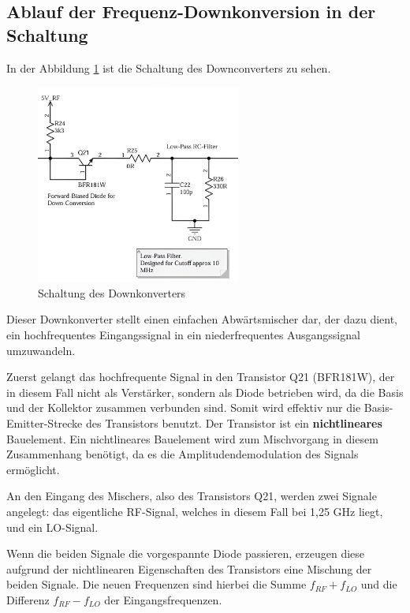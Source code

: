 \subsection{Ablauf der Frequenz-Downkonversion in der Schaltung}
In der Abbildung \ref{fig:downconverter} ist die Schaltung des Downconverters zu sehen.
\begin{figure}[H]
    \centering
    \includegraphics[width=0.6\textwidth]{Pictures/Downconverter.png}
    \caption{Schaltung des Downkonverters}
    \label{fig:downconverter}
\end{figure}
Dieser Downkonverter stellt einen einfachen Abwärtsmischer dar, der dazu dient, ein hochfrequentes Eingangssignal in ein niederfrequentes Ausgangssignal umzuwandeln. 

Zuerst gelangt das hochfrequente Signal in den Transistor Q21 (BFR181W), der in diesem Fall nicht als Verstärker, sondern als Diode betrieben wird, da die Basis und der Kollektor zusammen verbunden sind. Somit wird effektiv nur die Basis-Emitter-Strecke des Transistors benutzt. Der Transistor ist ein \textbf{nichtlineares} Bauelement.
Ein nichtlineares Bauelement wird zum Mischvorgang in diesem Zusammenhang benötigt, da es die Amplitudendemodulation des Signals ermöglicht. 

An den Eingang des Mischers, also des Transistors Q21, werden zwei Signale angelegt: das eigentliche \ac{RF}-Signal, welches in diesem Fall bei 1,25 GHz liegt, und ein \ac{LO}-Signal.

Wenn die beiden Signale die vorgespannte Diode passieren, erzeugen diese aufgrund der nichtlinearen Eigenschaften des Transistors eine Mischung der beiden Signale. Die neuen Frequenzen sind hierbei die Summe $f_{RF} + f_{LO}$ und die Differenz $f_{RF} - f_{LO}$ der Eingangsfrequenzen. 


